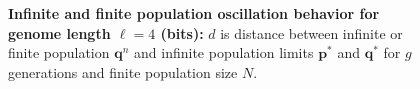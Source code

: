 \begin{figure}[H]
\begin{center}
{}


\caption{\textbf{Infinite and finite population oscillation behavior for genome length $\ell = 4$ (bits):} $d$ is
  distance between infinite or finite population ${\bm q}^n$ and infinite
  population limits ${{\bm p}^\ast}$ and ${{\bm q}^{\ast}}$ for $g$ generations and finite population size $N$.}
\label{oscillation_4}
\end{center}
\end{figure}


